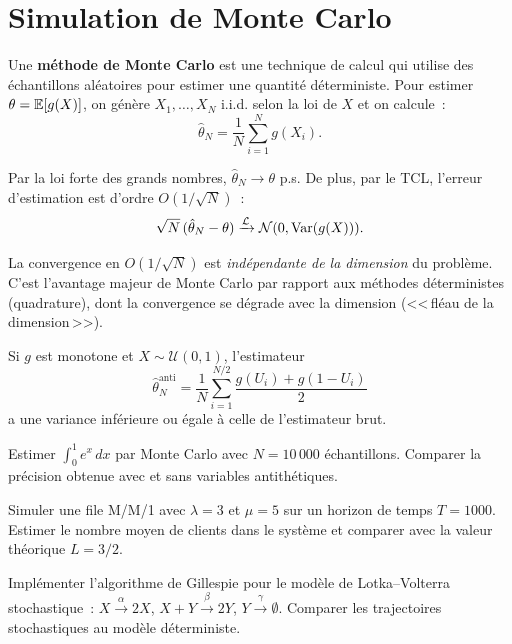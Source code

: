 \section{Simulation de Monte Carlo}
\label{sec:monte_carlo}

\begin{definition}
Une \textbf{m\'ethode de Monte Carlo} est une technique de calcul qui
utilise des \'echantillons al\'eatoires pour estimer une quantit\'e
d\'eterministe. Pour estimer $\theta = \mathbb{E}[g(X)]$, on g\'en\`ere
$X_1, \ldots, X_N$ i.i.d. selon la loi de $X$ et on calcule~:
\[
  \hat{\theta}_N = \frac{1}{N} \sum_{i=1}^N g(X_i).
\]
\end{definition}

\begin{theoreme}
Par la loi forte des grands nombres, $\hat{\theta}_N \to \theta$ p.s.
De plus, par le TCL, l'erreur d'estimation est d'ordre $O(1/\sqrt{N})$~:
\[
  \sqrt{N}\,(\hat{\theta}_N - \theta) \xrightarrow{\mathcal{L}}
  \mathcal{N}(0, \mathrm{Var}(g(X))).
\]
\end{theoreme}

\begin{intuition}
La convergence en $O(1/\sqrt{N})$ est \emph{ind\'ependante de la dimension}
du probl\`eme. C'est l'avantage majeur de Monte Carlo par rapport
aux m\'ethodes d\'eterministes (quadrature), dont la convergence se
d\'egrade avec la dimension (<<\,fl\'eau de la dimension\,>>).
\end{intuition}

\begin{proposition}
Si $g$ est monotone et $X \sim \mathcal{U}(0,1)$, l'estimateur
\[
  \hat{\theta}_N^{\text{anti}} = \frac{1}{N}\sum_{i=1}^{N/2}
  \frac{g(U_i) + g(1-U_i)}{2}
\]
a une variance inf\'erieure ou \'egale \`a celle de l'estimateur brut.
\end{proposition}

\begin{exercice}
Estimer $\int_0^1 e^x\,dx$ par Monte Carlo avec $N = 10\,000$ \'echantillons.
Comparer la pr\'ecision obtenue avec et sans variables antith\'etiques.
\end{exercice}

\begin{exercice}
Simuler une file M/M/1 avec $\lambda = 3$ et $\mu = 5$ sur un horizon
de temps $T = 1000$. Estimer le nombre moyen de clients dans le
syst\`eme et comparer avec la valeur th\'eorique $L = 3/2$.
\end{exercice}

\begin{exercice}
Impl\'ementer l'algorithme de Gillespie pour le mod\`ele de
Lotka--Volterra stochastique~:
$X \xrightarrow{\alpha} 2X$, \quad $X + Y \xrightarrow{\beta} 2Y$,
\quad $Y \xrightarrow{\gamma} \emptyset$.
Comparer les trajectoires stochastiques au mod\`ele d\'eterministe.
\end{exercice}
